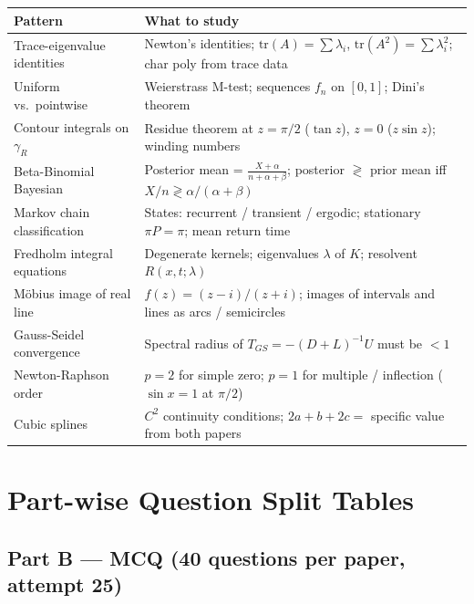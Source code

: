 \documentclass[12pt,a4paper]{article}
\begin{document}
\begin{center}
\renewcommand{\arraystretch}{1.25}
\begin{tabular}{@{}p{3.5cm}p{9.5cm}@{}}
\toprule
\rowcolor{bluelight}
\textbf{Pattern} & \textbf{What to study} \\
\midrule
Trace-eigenvalue identities & Newton's identities; $\mathrm{tr}(A)=\sum\lambda_i$, $\mathrm{tr}(A^2)=\sum\lambda_i^2$; char poly from trace data \\
Uniform vs.\ pointwise & Weierstrass M-test; sequences $f_n$ on $[0,1]$; Dini's theorem \\
Contour integrals on $\gamma_R$ & Residue theorem at $z=\pi/2$ ($\tan z$), $z=0$ ($z\sin z$); winding numbers \\
Beta-Binomial Bayesian & Posterior mean = $\frac{X+\alpha}{n+\alpha+\beta}$; posterior $\gtrless$ prior mean iff $X/n\gtrless\alpha/(\alpha+\beta)$ \\
Markov chain classification & States: recurrent / transient / ergodic; stationary $\pi P=\pi$; mean return time \\
Fredholm integral equations & Degenerate kernels; eigenvalues $\lambda$ of $K$; resolvent $R(x,t;\lambda)$ \\
Möbius image of real line & $f(z)=(z-i)/(z+i)$; images of intervals and lines as arcs / semicircles \\
Gauss-Seidel convergence & Spectral radius of $T_{GS}=-(D+L)^{-1}U$ must be $<1$ \\
Newton-Raphson order & $p=2$ for simple zero; $p=1$ for multiple / inflection ($\sin x=1$ at $\pi/2$) \\
Cubic splines & $C^2$ continuity conditions; $2a+b+2c=$ specific value from both papers \\
\bottomrule
\end{tabular}
\end{center}

\newpage

\section{Part-wise Question Split Tables}

\subsection{Part B — MCQ (40 questions per paper, attempt 25)}
\end{document}
